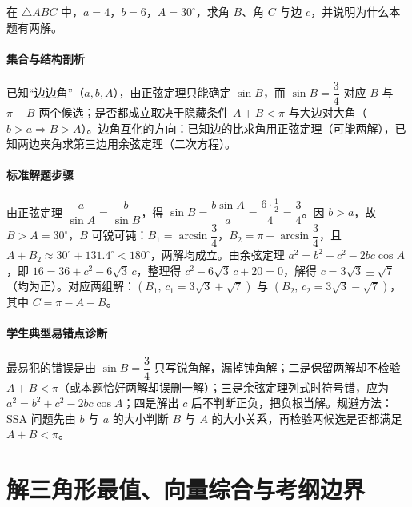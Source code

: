 \begin{problem}
在 $\triangle ABC$ 中，$a=4$，$b=6$，$A=30^\circ$，求角 $B$、角 $C$ 与边 $c$，并说明为什么本题有两解。
\end{problem}
\begin{solution}
\paragraph{集合与结构剖析}
已知“边边角”（$a,b,A$），由正弦定理只能确定 $\sin B$，而 $\sin B=\dfrac34$ 对应 $B$ 与 $\pi-B$ 两个候选；是否都成立取决于隐藏条件 $A+B<\pi$ 与大边对大角（$b>a\Rightarrow B>A$）。边角互化的方向：已知边的比求角用正弦定理（可能两解），已知两边夹角求第三边用余弦定理（二次方程）。
\paragraph{标准解题步骤}
由正弦定理 $\dfrac{a}{\sin A}=\dfrac{b}{\sin B}$，得 $\sin B=\dfrac{b\sin A}{a}=\dfrac{6\cdot\frac12}{4}=\dfrac34$。因 $b>a$，故 $B>A=30^\circ$，$B$ 可锐可钝：$B_1=\arcsin\dfrac34$，$B_2=\pi-\arcsin\dfrac34$，且 $A+B_2\approx30^\circ+131.4^\circ<180^\circ$，两解均成立。由余弦定理 $a^2=b^2+c^2-2bc\cos A$，即 $16=36+c^2-6\sqrt3\,c$，整理得 $c^2-6\sqrt3\,c+20=0$，解得 $c=3\sqrt3\pm\sqrt7$（均为正）。对应两组解：$\left(B_1,\,c_1=3\sqrt3+\sqrt7\right)$ 与 $\left(B_2,\,c_2=3\sqrt3-\sqrt7\right)$，其中 $C=\pi-A-B$。
\paragraph{学生典型易错点诊断}
最易犯的错误是由 $\sin B=\dfrac34$ 只写锐角解，漏掉钝角解；二是保留两解却不检验 $A+B<\pi$（或本题恰好两解却误删一解）；三是余弦定理列式时符号错，应为 $a^2=b^2+c^2-2bc\cos A$；四是解出 $c$ 后不判断正负，把负根当解。规避方法：SSA 问题先由 $b$ 与 $a$ 的大小判断 $B$ 与 $A$ 的大小关系，再检验两候选是否都满足 $A+B<\pi$。
\end{solution}

\section{解三角形最值、向量综合与考纲边界}

